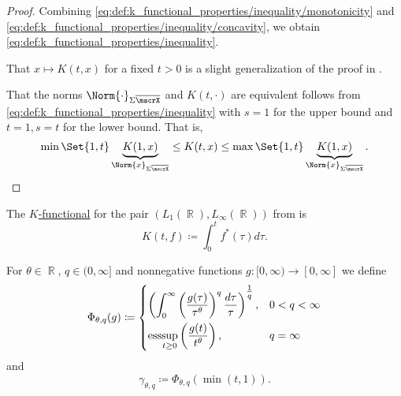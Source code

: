 \begin{proof}
  Combining \eqref{eq:def:k_functional_properties/inequality/monotonicity} and \eqref{eq:def:k_functional_properties/inequality/concavity}, we obtain \eqref{eq:def:k_functional_properties/inequality}.

   That \( x \mapsto K(t, x) \) for a fixed \( t > 0 \) is a slight generalization of the proof in .

  That the norms \( \Norm{\cdot}_{\Sigma \overline{\mscrX}} \) and \( K(t, \cdot) \) are equivalent follows from \eqref{eq:def:k_functional_properties/inequality} with \( s = 1 \) for the upper bound and \( t = 1, s = t \) for the lower bound. That is,
  \begin{equation*}
    \min\Set{1, t} \underbrace{K(1, x)}_{\Norm{x}_{\Sigma \overline{\mscrX}}} \leq K(t, x) \leq \max\Set{1, t} \underbrace{K(1, x)}_{\Norm{x}_{\Sigma \overline{\mscrX}}}.
  \end{equation*}
\end{proof}

\begin{example}\label{thm:lp_interpolation_spaces/k_functional}
  The \hyperref[def:k_functional]{\( K \)-functional} for the pair \( (L_1(\BbbR), L_\infty(\BbbR)) \) from  is
  \begin{equation*}
    K(t, f) \coloneqq \int_0^t f^*(\tau) d\tau.
  \end{equation*}
\end{example}

\begin{definition}\label{def:lorenz_quasinorm}
  For \( \theta \in \BbbR \), \( q \in (0, \infty] \) and nonnegative functions \( g: [0, \infty) \to [0, \infty] \) we define
  \begin{equation}\label{eq:def:lorenz_quasinorm}
    \Phi_{\theta,q}(g) \coloneqq \begin{dcases}
      \left( \int_0^\infty \left( \frac {g(\tau)} {\tau^\theta} \right)^q \frac {d\tau} \tau \right)^{\tfrac 1 q}, &0 < q < \infty \\
      \operatorname{ess}\!\sup_{t \geq 0} \left( \frac {g(t)} {t^\theta} \right),                                                &q = \infty
    \end{dcases}
  \end{equation}
  and
  \begin{equation}\label{eq:def:lorenz_quasinorm/gamma}
    \gamma_{\theta,q} \coloneqq \Phi_{\theta,q}(\min(t, 1)).
  \end{equation}
\end{definition}

